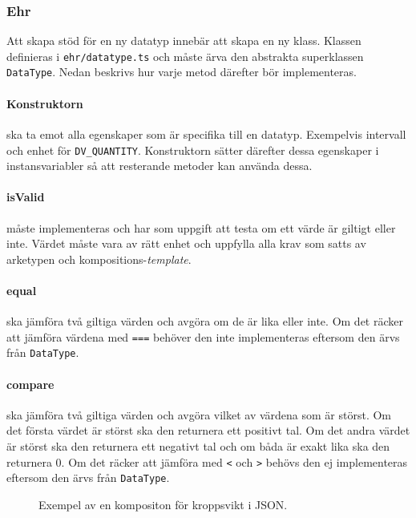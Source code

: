\documentclass[techdoc/techdoc.tex]{subfiles}
\begin{document}
\subsubsection{Ehr}
Att skapa stöd för en ny datatyp innebär att skapa en ny klass. Klassen
definieras i \texttt{ehr/datatype.ts} och måste ärva den abstrakta superklassen
\texttt{DataType}. Nedan beskrivs hur varje metod därefter bör implementeras.

\paragraph{Konstruktorn} ska ta emot alla egenskaper som är specifika till en
datatyp. Exempelvis intervall och enhet för \texttt{DV\_QUANTITY}. Konstruktorn
sätter därefter dessa egenskaper i instansvariabler så att resterande metoder
kan använda dessa.

\paragraph{isValid} måste implementeras och har som uppgift att testa om ett
värde är giltigt eller inte. Värdet måste vara av rätt enhet och uppfylla alla
krav som satts av arketypen och kompositions-\emph{template}.

\paragraph{equal} ska jämföra två giltiga värden och avgöra om de är lika eller
inte. Om det räcker att jämföra värdena med \texttt{===} behöver den inte
implementeras eftersom den ärvs från \texttt{DataType}.

\paragraph{compare} ska jämföra två giltiga värden och avgöra vilket av värdena
som är störst. Om det första värdet är störst ska den returnera ett positivt
tal. Om det andra värdet är störst ska den returnera ett negativt tal och om
båda är exakt lika ska den returnera 0. Om det räcker att jämföra med
\texttt{<} och \texttt{>} behövs den ej implementeras eftersom den ärvs
från \texttt{DataType}.

\begin{wrapfigure}{r}{0.35\linewidth}
    
    \caption{Exempel av en kompositon för kroppsvikt i JSON.}
    \label{fig:json_weight}
\end{wrapfigure}
\end{document}
